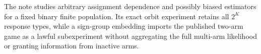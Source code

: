 The note studies arbitrary assignment dependence and possibly biased estimators for a fixed binary finite population.  Its exact orbit experiment retains all \(2^K\) response types, while a sign-group embedding imports the published two-arm game as a lawful subexperiment without aggregating the full multi-arm likelihood or granting information from inactive arms.